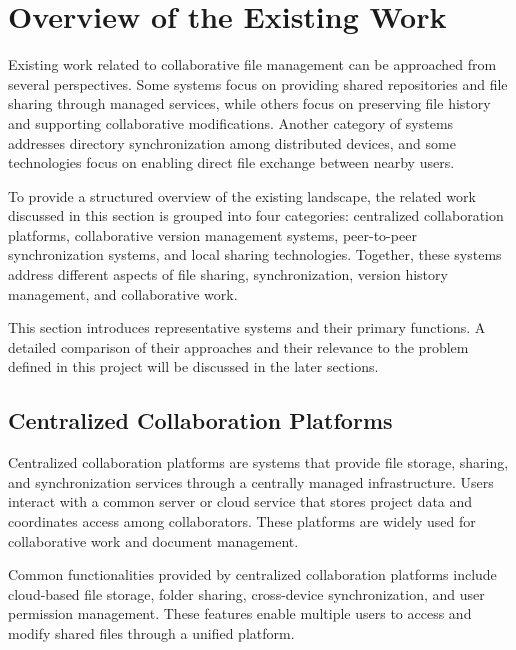 \section{Overview of the Existing Work}
Existing work related to collaborative file management can be approached from several perspectives.
Some systems focus on providing shared repositories and file sharing through managed services, while others focus on preserving file history and supporting collaborative modifications.
Another category of systems addresses directory synchronization among distributed devices, and some technologies focus on enabling direct file exchange between nearby users.

To provide a structured overview of the existing landscape, the related work discussed in this section is grouped into four categories: centralized collaboration platforms, collaborative version management systems, peer-to-peer synchronization systems, and local sharing technologies. Together, these systems address different aspects of file sharing, synchronization, version history management, and collaborative work.

This section introduces representative systems and their primary functions.
A detailed comparison of their approaches and their relevance to the problem defined in this project will be discussed in the later sections.



\subsection{Centralized Collaboration Platforms}

Centralized collaboration platforms are systems that provide file storage, sharing, and synchronization services through a centrally managed infrastructure.
Users interact with a common server or cloud service that stores project data and coordinates access among collaborators.
These platforms are widely used for collaborative work and document management.

Common functionalities provided by centralized collaboration platforms include cloud-based file storage, folder sharing, cross-device synchronization, and user permission management.
These features enable multiple users to access and modify shared files through a unified platform.


